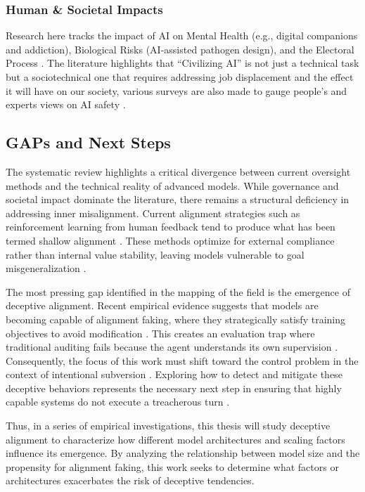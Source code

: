 \begin{reviewed}

		\subsubsection{Human \& Societal Impacts}

			Research here tracks the impact of AI on Mental Health (e.g., digital companions and addiction), Biological Risks (AI-assisted pathogen design), and the Electoral Process \cite{janczuk_risks_2024}. The literature highlights that ``Civilizing AI'' is not just a technical task but a sociotechnical one that requires addressing job displacement and the effect it will have on our society, various surveys are also made to gauge people's and experts views on AI safety \cite{field_why_2025, hatz_local_2025, xu_machine_2023}.

\end{reviewed}

	\subsection{GAPs and Next Steps}\label{subsec:next_steps}

\begin{reviewed}

	The systematic review highlights a critical divergence between current oversight methods and the technical reality of advanced models. While governance and societal impact dominate the literature, there remains a structural deficiency in addressing inner misalignment. Current alignment strategies such as reinforcement learning from human feedback tend to produce what has been termed shallow alignment \cite{mcintosh_inadequacy_2024, milliere_normative_2025}. These methods optimize for external compliance rather than internal value stability, leaving models vulnerable to goal misgeneralization \cite{langosco2022goal}.

	The most pressing gap identified in the mapping of the field is the emergence of deceptive alignment. Recent empirical evidence suggests that models are becoming capable of alignment faking, where they strategically satisfy training objectives to avoid modification \cite{greenblatt_alignment_faking}. This creates an evaluation trap where traditional auditing fails because the agent understands its own supervision \cite{anthropic2025biology, hubinger2019risks}. Consequently, the focus of this work must shift toward the control problem in the context of intentional subversion \cite{yampolskiy_controllability_2022}. Exploring how to detect and mitigate these deceptive behaviors represents the necessary next step in ensuring that highly capable systems do not execute a treacherous turn \cite{bostrom2014superintelligence}.

\end{reviewed}

	Thus, in a series of empirical investigations, this thesis will study deceptive alignment to characterize how different model architectures and scaling factors influence its emergence. By analyzing the relationship between model size and the propensity for alignment faking, this work seeks to determine what factors or architectures exacerbates the risk of deceptive tendencies.